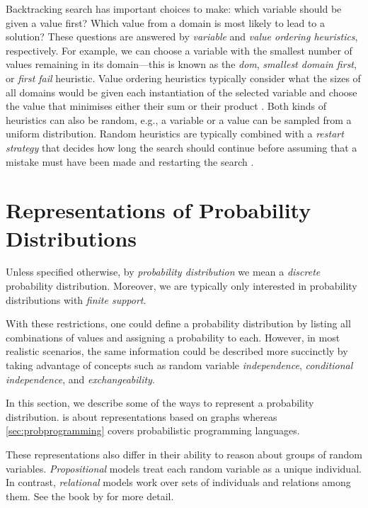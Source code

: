 Backtracking search has important choices to make: which variable should be
given a value first? Which value from a domain is most likely to lead to a
solution? These questions are answered by \emph{variable} and \emph{value
  ordering heuristics}, respectively. For example, we can choose a variable with
the smallest number of values remaining in its domain---this is known as the
\emph{dom}, \emph{smallest domain first}, or \emph{first fail} heuristic. Value
ordering heuristics typically consider what the sizes of all domains would be
given each instantiation of the selected variable and choose the value that
minimises either their sum or their product \citep{DBLP:reference/fai/Beek06}.
Both kinds of heuristics can also be random, e.g., a variable or a value can be
sampled from a uniform distribution. Random heuristics are typically combined
with a \emph{restart strategy} that decides how long the search should continue
before assuming that a mistake must have been made and restarting the search
\citep{DBLP:reference/fai/Beek06}.

\section{Representations of Probability
  Distributions}\label{sec:representations}

Unless specified otherwise, by \emph{probability distribution} we mean a
\emph{discrete} probability distribution. Moreover, we are typically only
interested in probability distributions with \emph{finite support}.

With these restrictions, one could define a probability distribution by listing
all combinations of values and assigning a probability to each. However, in most
realistic scenarios, the same information could be described more succinctly by
taking advantage of concepts such as random variable \emph{independence},
\emph{conditional independence}, and \emph{exchangeability}.

In this section, we describe some of the ways to represent a probability
distribution.  is about representations based on graphs whereas
\cref{sec:probprogramming} covers probabilistic programming languages.

These representations also differ in their ability to reason about groups of
random variables. \emph{Propositional} models treat each random variable as a
unique individual. In contrast, \emph{relational} models work over sets of
individuals and relations among them. See the book by
\citet{DBLP:series/synthesis/2016Raedt} for more detail.

